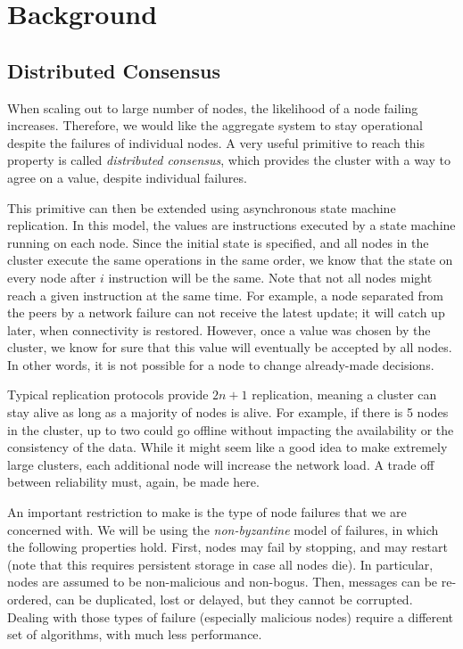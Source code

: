 \chapter{Background}
\label{chap:background}

\section{Distributed Consensus}

When scaling out to large number of nodes, the likelihood of a node failing increases.
Therefore, we would like the aggregate system to stay operational despite the failures of individual nodes.
A very useful primitive to reach this property is called \emph{distributed consensus}, which provides the cluster with a way to agree on a value, despite individual failures.

This primitive can then be extended using asynchronous state machine replication.
In this model, the values are instructions executed by a state machine running on each node.
Since the initial state is specified, and all nodes in the cluster execute the same operations in the same order, we know that the state on every node after $i$ instruction will be the same.
Note that not all nodes might reach a given instruction at the same time.
For example, a node separated from the peers by a network failure can not receive the latest update; it will catch up later, when connectivity is restored. 
However, once a value was chosen by the cluster, we know for sure that this value will eventually be accepted by all nodes. 
In other words, it is not possible for a node to change already-made decisions. 

Typical replication protocols provide $2n + 1$ replication, meaning a cluster can stay alive as long as a majority of nodes is alive.
For example, if there is 5 nodes in the cluster, up to two could go offline without impacting the availability or the consistency of the data.
While it might seem like a good idea to make extremely large clusters, each additional node will increase the network load.
A trade off between reliability must, again, be made here.

An important restriction to make is the type of node failures that we are concerned with.
We will be using the \emph{non-byzantine} model of failures\cite{paxos_made_simple}, in which the following properties hold.
First, nodes may fail by stopping, and may restart (note that this requires persistent storage in case all nodes die).
In particular, nodes are assumed to be non-malicious and non-bogus.
Then, messages can be re-ordered, can be duplicated, lost or delayed, but they cannot be corrupted.
Dealing with those types of failure (especially malicious nodes) require a different set of algorithms, with much less performance.

